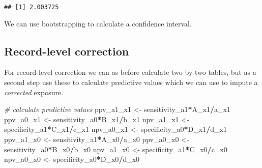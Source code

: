 \documentclass[
]{book}
\newenvironment{Shaded}{\begin{snugshade}}{\end{snugshade}}
\newcommand{\CommentTok}[1]{\textcolor[rgb]{0.56,0.35,0.01}{\textit{#1}}}
\newcommand{\NormalTok}[1]{#1}
\newcommand{\OtherTok}[1]{\textcolor[rgb]{0.56,0.35,0.01}{#1}}
\newcommand{\SpecialCharTok}[1]{\textcolor[rgb]{0.81,0.36,0.00}{\textbf{#1}}}
\begin{document}
\begin{verbatim}
## [1] 2.003725
\end{verbatim}

We can use bootstrapping to calculate a confidence interval.

\hypertarget{record-level-correction}{%
\subsection{Record-level correction}\label{record-level-correction}}

For record-level correction we can as before calculate two by two tables, but as a second step use these to calculate predictive values which we can use to impute a \emph{corrected} exposure.

\begin{Shaded}
\begin{Highlighting}[]
\CommentTok{\# calculate predictive values}
\NormalTok{ppv\_a1\_x1 }\OtherTok{\textless{}{-}}\NormalTok{ sensitivity\_a1}\SpecialCharTok{*}\NormalTok{A\_x1}\SpecialCharTok{/}\NormalTok{a\_x1}
\NormalTok{ppv\_a0\_x1 }\OtherTok{\textless{}{-}}\NormalTok{ sensitivity\_a0}\SpecialCharTok{*}\NormalTok{B\_x1}\SpecialCharTok{/}\NormalTok{b\_x1}
\NormalTok{npv\_a1\_x1 }\OtherTok{\textless{}{-}}\NormalTok{ specificity\_a1}\SpecialCharTok{*}\NormalTok{C\_x1}\SpecialCharTok{/}\NormalTok{c\_x1}
\NormalTok{npv\_a0\_x1 }\OtherTok{\textless{}{-}}\NormalTok{ specificity\_a0}\SpecialCharTok{*}\NormalTok{D\_x1}\SpecialCharTok{/}\NormalTok{d\_x1 }
\NormalTok{ppv\_a1\_x0 }\OtherTok{\textless{}{-}}\NormalTok{ sensitivity\_a1}\SpecialCharTok{*}\NormalTok{A\_x0}\SpecialCharTok{/}\NormalTok{a\_x0}
\NormalTok{ppv\_a0\_x0 }\OtherTok{\textless{}{-}}\NormalTok{ sensitivity\_a0}\SpecialCharTok{*}\NormalTok{B\_x0}\SpecialCharTok{/}\NormalTok{b\_x0}
\NormalTok{npv\_a1\_x0 }\OtherTok{\textless{}{-}}\NormalTok{ specificity\_a1}\SpecialCharTok{*}\NormalTok{C\_x0}\SpecialCharTok{/}\NormalTok{c\_x0}
\NormalTok{npv\_a0\_x0 }\OtherTok{\textless{}{-}}\NormalTok{ specificity\_a0}\SpecialCharTok{*}\NormalTok{D\_x0}\SpecialCharTok{/}\NormalTok{d\_x0 }


\end{Highlighting}
\end{Shaded}
\end{document}
